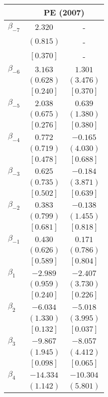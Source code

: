 \documentclass[12pt]{article}
\begin{document}
\begin{table}[H]
\centering
\label{tab:young_black_event_study_PE}
\begin{tabular}{lcc}
\toprule
& \multicolumn{2}{c}{PE (2007)} \\
\cmidrule(lr){2-3}
\midrule
$\beta_{-7}$ & $  2.320$ & - \\
& $(  0.815)$ & - \\
& $[  0.370]$ & - \\
$\beta_{-6}$ & $  3.163$ & $  1.301$ \\
& $(  0.628)$ & $(  3.476)$ \\
& $[  0.240]$ & $[  0.370]$ \\
$\beta_{-5}$ & $  2.038$ & $  0.639$ \\
& $(  0.675)$ & $(  1.380)$ \\
& $[  0.276]$ & $[  0.380]$ \\
$\beta_{-4}$ & $  0.772$ & $ -0.165$ \\
& $(  0.719)$ & $(  4.030)$ \\
& $[  0.478]$ & $[  0.688]$ \\
$\beta_{-3}$ & $  0.625$ & $ -0.184$ \\
& $(  0.735)$ & $(  3.871)$ \\
& $[  0.502]$ & $[  0.639]$ \\
$\beta_{-2}$ & $  0.383$ & $ -0.138$ \\
& $(  0.799)$ & $(  1.455)$ \\
& $[  0.681]$ & $[  0.818]$ \\
$\beta_{-1}$ & $  0.430$ & $  0.171$ \\
& $(  0.626)$ & $(  0.786)$ \\
& $[  0.589]$ & $[  0.804]$ \\
$\beta_{1}$ & $ -2.989$ & $ -2.407$ \\
& $(  0.959)$ & $(  3.730)$ \\
& $[  0.240]$ & $[  0.226]$ \\
$\beta_{2}$ & $ -6.034$ & $ -5.018$ \\
& $(  1.330)$ & $(  3.995)$ \\
& $[  0.132]$ & $[  0.037]$ \\
$\beta_{3}$ & $ -9.867$ & $ -8.057$ \\
& $(  1.945)$ & $(  4.412)$ \\
& $[  0.098]$ & $[  0.065]$ \\
$\beta_{4}$ & $-14.334$ & $-10.304$ \\
& $(  1.142)$ & $(  5.801)$ \\

\end{tabular}
\end{table}
\end{document}
